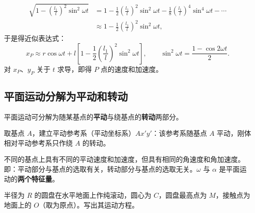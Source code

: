 \begin{example}
\begin{solution}
\begin{equation}
  \begin{aligned}
    \sqrt{1-\left(\frac{l_1}{l}\right)^{2}\sin^{2}\omega t}
      &= 1-\frac{1}{2}\left(\frac{l_1}{l}\right)^{2}\sin^{2}\omega t
         -\frac{1}{8}\left(\frac{l_1}{l}\right)^{4}\sin^{4}\omega t-\cdots\\
      &\approx 1-\frac{1}{2}\left(\frac{l_1}{l}\right)^{2}\sin^{2}\omega t,
  \end{aligned}
\end{equation}
于是得近似表达式：
\begin{equation}\label{eq:9-ex1-Papprox}
  x_P \approx r\cos\omega t + l\left[1-\frac{1}{2}\left(\frac{l_1}{l}\right)^{2}\sin^{2}\omega t\right],
  \qquad \sin^{2}\omega t=\frac{1-\cos 2\omega t}{2}.
\end{equation}
对 $x_P$、$y_P$ 关于 $t$ 求导，即得 $P$ 点的速度和加速度。
\end{solution}
\end{example}

\subsection{平面运动分解为平动和转动}

平面运动可分解为随某基点的\textbf{平动}与绕基点的\textbf{转动}两部分。


取基点 $A$，建立平动参考系（平动坐标系）$Ax'y'$：该参考系随基点 $A$ 平动，刚体相对平动参考系只作绕 $A$ 的转动。

\begin{keybox}
不同的基点上具有不同的平动速度和加速度，但具有相同的角速度和角加速度。即：平动部分与基点的选取有关，转动部分与基点的选取无关。$\omega$ 与 $\alpha$ 是平面运动的\textbf{两个特征量}。
\end{keybox}

\begin{example}[圆盘纯滚动的运动方程]
半径为 $R$ 的圆盘在水平地面上作纯滚动，圆心为 $C$，圆盘最高点为 $M$，接触点为地面上的 $O$（取为原点）。写出其运动方程。
\end{example}

\begin{center}
\end{center}


